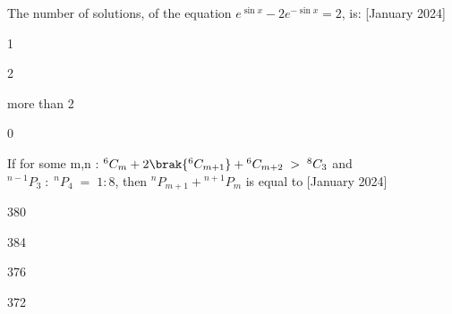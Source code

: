 \bigskip
\item The number of solutions, of the equation $e^{\sin{x}}-2e^{-\sin{x}}=2$, is: \hfill{[January 2024]}
\begin{enumerate}
    \begin{multicols}{2}
        \item 1
        \columnbreak
        \item 2
    \end{multicols}
    \begin{multicols}{2}
        \item more than 2
        \item 0
    \end{multicols}
\end{enumerate}
\bigskip
\item If for some m,n : ${}^{6}C_{m}+2\brak{{}^{6}C_{m+1}}+{}^{6}C_{m+2}\;>\; {}^{8}C_{3}$ and ${}^{n-1}P_{3}\;:\;{}^{n}P_{4}\;=\;1:8$, then ${}^{n}P_{m+1}+{}^{n+1}P_{m}$ is equal to \hfill{[January 2024]}
\begin{enumerate}
    \begin{multicols}{4}
        \item 380
        \item 384
        \item 376
        \item 372
    \end{multicols}
\end{enumerate}
 
